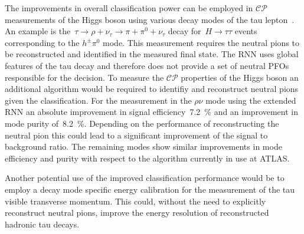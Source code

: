 The improvements in overall classification power can be employed in
$\mathcal{CP}$ measurements of the Higgs boson using various decay modes of the
tau lepton~\cite{Berge2014}. An example is
the~$\tau \to \rho + \nu_\tau \to \pi + \pi^0 + \nu_\tau$ decay
for~$H \to \tau\tau$ events corresponding to the $h^\pm \pi^0$ mode. This
measurement requires the neutral pions to be reconstructed and identified in the
measured final state. The RNN uses global features of the tau decay and
therefore does not provide a set of neutral PFOs responsible for the decision.
To measure the $\mathcal{CP}$ properties of the Higgs boson an additional
algorithm would be required to identifiy and reconstruct neutral pions given the
classification. For the measurement in the $\rho\nu$ mode using the extended RNN
an absolute improvement in signal efficiency~\SI{7.2}{\percent} and an
improvement in mode purity of~\SI{8.2}{\percent}. Depending on the performance
of reconstructing the neutral pion this could lead to a significant improvement
of the signal to background ratio. The remaining modes show similar improvements
in mode efficiency and purity with respect to the algorithm currently in use at
ATLAS.

Another potential use of the improved classification performance would be to
employ a decay mode specific energy calibration for the measurement of the tau
visible transverse momentum. This could, without the need to explicitly
reconstruct neutral pions, improve the energy resolution of reconstructed
hadronic tau decays. 


